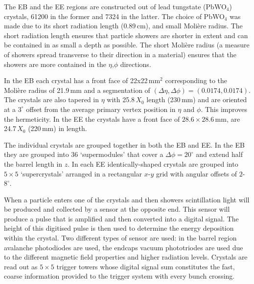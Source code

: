 The EB and the EE regions are constructed out of lead tungstate (PbWO$_{4}$) crystals, 61200 in the former and 7324 in the latter. The choice of PbWO$_{4}$ was made due to its short radiation length (0.89\,cm), and small Moli\`{e}re radius. The short radiation length ensures that particle showers are shorter in extent and can be contained in as small a depth as possible. The short Moli\`{e}re radius (a measure of showers spread transverse to their direction in a material) ensures that the showers are more contained in the $\eta$,$\phi$ directions. 

In the EB each crystal has a front face of 22x22\,mm$^{2}$ corresponding to the Moli\`{e}re radius of 21.9\,mm and a segmentation of $(\Delta\eta,\Delta\phi) = (0.0174,0.0174)$. 
The crystals are also tapered in $\eta$ with 25.8\,$X_{0}$ length (230\,mm) and are oriented at a $3^{\circ}$ offset from the average primary vertex position in $\eta$ and $\phi$. This improves the hermeticity.
In the EE the crystals have a front face of $28.6\times{}28.6$\,mm, are 24.7\,$X_{0}$ (220\,mm) in length. 

The individual crystals are grouped together in both the EB and EE. In the EB they are grouped into 36 `supermodules' that cover a $\Delta\phi = 20^{\circ}$ and extend half the barrel length in $z$.
In each EE identically-shaped crystals are grouped into $5\times5$ `supercrystals' arranged in a rectangular $x$-$y$ grid with angular offsets of $2$-$8^{\circ}$.

When a particle enters one of the crystals and then showers scintillation light will be produced and collected by a sensor at the opposite end. This sensor will produce a pulse that is amplified and then converted into a digital signal. The height of this digitised pulse is then used to determine the energy deposition within the crystal. 
Two different types of sensor are used: in the barrel region avalanche photodiodes are used, the endcaps vacuum phototriodes are used due to the different magnetic field properties and higher radiation levels.
Crystals are read out as $5\times{5}$ trigger towers whose digital signal sum constitutes the fast, coarse information provided to the trigger system with every bunch crossing.



